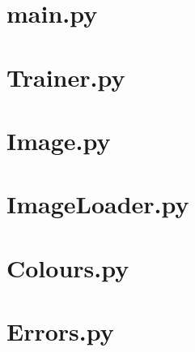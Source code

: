 \documentclass[
	12pt, %
]{fphw}
\begin{document}
\newpage
\appendix
\appendixpage
\addappheadtotoc

\section{main.py}

\clearpage
\newpage
\section{Trainer.py}

\clearpage
\newpage
	\section{Image.py}

\clearpage
\newpage
\section{ImageLoader.py}

\clearpage
\newpage
\section{Colours.py}

\clearpage
\newpage
\section{Errors.py}

%







%
\end{document}
